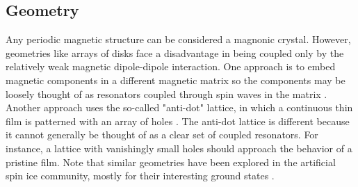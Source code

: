 \documentclass[aps,prx,twocolumn,superscriptaddress,floatfix]{revtex4-2}
\begin{document}
\subsection{Geometry}
Any periodic magnetic structure can be considered a magnonic crystal. However, geometries like arrays of disks face a disadvantage in being coupled only by the relatively weak magnetic dipole-dipole interaction. One approach is to embed magnetic components in a different magnetic matrix so the components may be loosely thought of as resonators coupled through spin waves in the matrix \cite{puszkarski_magnonic_2003, krawczyk_magnonic_2013, centala_compact_2023, yang_flatbands_2025}. Another approach uses the so-called "anti-dot" lattice, in which a continuous thin film is patterned with an array of holes \cite{neusser_anisotropic_2010, ulrichs_magnonic_2010, bali_high-symmetry_2012, gros_phase_2021, wang_observation_2023}. The anti-dot lattice is different because it cannot generally be thought of as a clear set of coupled resonators. For instance, a lattice with vanishingly small holes should approach the behavior of a pristine film. Note that similar geometries have been explored in the artificial spin ice community, mostly for their interesting ground states \cite{qi_direct_2008, gartside_realization_2018}.
\end{document}
